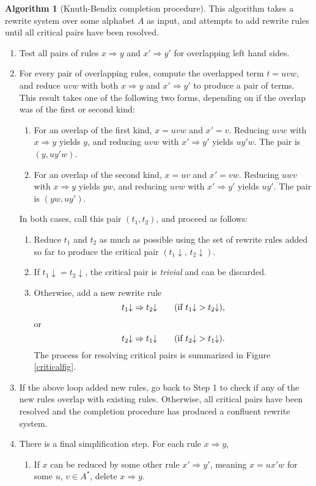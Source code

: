 \documentclass[a4paper,headsepline,bibliography=totoc,toc=flat,fleqn,twoside=semi]{scrbook}
\theoremstyle{definition}
\theoremstyle{definition}
\theoremstyle{definition}
\newtheorem{algorithm}{Algorithm}[chapter]
\begin{document}
\begin{algorithm}[Knuth-Bendix completion procedure]\label{knuthbendix} This algorithm takes a rewrite system over some alphabet $A$ as input, and attempts to add rewrite rules until all critical pairs have been resolved.
\begin{enumerate}
\item Test all pairs of rules $x\Rightarrow y$ and $x'\Rightarrow y'$ for overlapping left hand sides.
\item For every pair of overlapping rules, compute the overlapped term $t=uvw$, and reduce $uvw$ with both $x\Rightarrow y$ and $x'\Rightarrow y'$ to produce a pair of terms. This result takes one of the following two forms, depending on if the overlap was of the first or second kind:
\begin{enumerate}
\item For an overlap of the first kind, $x=uvw$ and $x'=v$. Reducing $uvw$ with $x\Rightarrow y$ yields $y$, and reducing $uvw$ with $x'\Rightarrow y'$ yields $uy'w$. The pair is $(y, uy'w)$.
\item For an overlap of the second kind, $x=uv$ and $x'=vw$. Reducing $uwv$ with $x\Rightarrow y$ yields $yw$, and reducing $uvw$ with $x'\Rightarrow y'$ yields $uy'$. The pair is $(yw, uy')$.
\end{enumerate}
In both cases, call this pair $(t_1, t_2)$, and proceed as follows:
\begin{enumerate}
\item Reduce $t_1$ and $t_2$ as much as possible using the set of rewrite rules added so far to produce the critical pair $({t}_1{\downarrow},\, {t}_2{\downarrow})$.
\item If ${t}_1{\downarrow}={t}_2{\downarrow}$, the critical pair is \emph{trivial} and can be discarded. \item Otherwise, add a new rewrite rule
\[{t}_1{\downarrow}\Rightarrow {t}_2{\downarrow}\qquad\hbox{(if ${t}_1{\downarrow}>{t}_2{\downarrow}$),}\]
or
\[{t}_2{\downarrow}\Rightarrow {t}_1{\downarrow}\qquad\hbox{(if ${t}_2{\downarrow}>{t}_1{\downarrow}$).}\]
The process for resolving critical pairs is summarized in Figure \ref{criticalfig}.
\end{enumerate}
\item If the above loop added new rules, go back to Step 1 to check if any of the new rules overlap with existing rules. Otherwise, all critical pairs have been resolved and the completion procedure has produced a confluent rewrite system.
\item There is a final simplification step. For each rule $x\Rightarrow y$,
\begin{enumerate}
\item If $x$ can be reduced by some other rule $x'\Rightarrow y'$, meaning $x=ux'w$ for some $u$, $v\in A^*$, delete $x\Rightarrow y$.


\end{enumerate}
\end{enumerate}
\end{algorithm}
\end{document}
